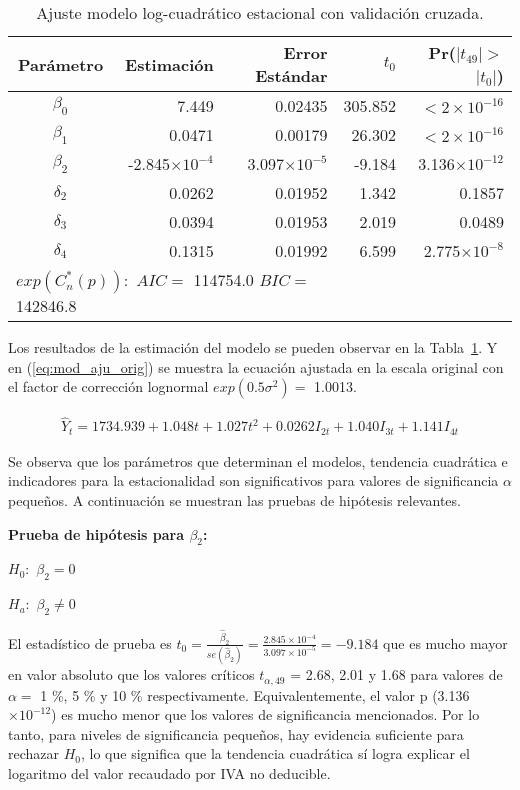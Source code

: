 \documentclass[11pt, letterpaper, twoside]{article}
\begin{document}
\begin{table}[ht]
\caption{Ajuste modelo log-cuadrático estacional con validación cruzada.}
\centering
\begin{tabular}{crrrr}
Parámetro & Estimación & Error Estándar & $t_0$ & Pr($|t_{49}|>$$|t_0|$) \\
  \hline
$\beta_0$ & 7.449 & 0.02435 & 305.852 & $<2\times10^{-16}$ \\
$\beta_1$ & 0.0471 & 0.00179 &  26.302 & $<2\times10^{-16}$ \\
$\beta_2$ & -2.845$\times10^{-4}$ & 3.097$\times10^{-5}$ & -9.184 & 3.136$\times10^{-12}$ \\
$\delta_2$ & 0.0262 & 0.01952 & 1.342 & 0.1857 \\
$\delta_3$ & 0.0394 & 0.01953 & 2.019 & 0.0489 \\
$\delta_4$ & 0.1315 & 0.01992 & 6.599 & 2.775$\times10^{-8}$ \\
   \hline
    \multicolumn{3}{l}{$exp(C_n^*(p)):$ $AIC=$ 114754.0 $BIC=$ 142846.8} & & \\
    \hline
\end{tabular}
\label{tab:modelo_aju}
\end{table}

Los resultados de la estimación del modelo se pueden observar en la Tabla~\ref{tab:modelo_aju}. Y en (\ref{eq:mod_aju_orig}) se muestra la ecuación ajustada en la escala original con el factor de corrección lognormal $exp(0.5\sigma^2)=$ 1.0013.

\begin{align}
    \label{eq:mod_aju_orig}
    \hat{Y}_t=1734.939+1.048 t + 1.027 t^2 + 0.0262 I_{2t} + 1.040 I_{3t} + 1.141 I_{4t}
\end{align}

Se observa que los parámetros que determinan el modelos, tendencia cuadrática e indicadores para la estacionalidad son significativos  para valores de significancia $\alpha$ pequeños. A continuación se muestran las pruebas de hipótesis relevantes.

\textbf{Prueba de hipótesis para $\beta_2$:}

$H_0:$ $\beta_2 = 0$

$H_a:$ $\beta_2 \neq 0$

El estadístico de prueba es $t_0=\frac{\hat{\beta}_2}{se(\hat{\beta}_2)}=\frac{2.845\times10^{-4}}{3.097\times10^{-5}}=-9.184$ que es mucho mayor en valor absoluto que los valores críticos $t_{\alpha,49}$ =  2.68, 2.01 y 1.68 para valores de $\alpha =$ 1 \%, 5 \% y 10 \% respectivamente. Equivalentemente, el valor p (3.136$\times10^{-12}$) es mucho menor que los valores de significancia mencionados. Por lo tanto, para niveles de significancia pequeños, hay evidencia suficiente para rechazar $H_0$, lo que significa que la tendencia cuadrática sí logra explicar el logaritmo del valor recaudado por IVA no deducible.
\end{document}
